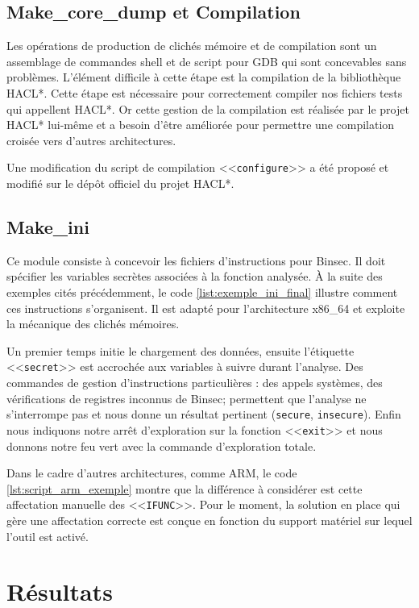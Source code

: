 \subsection*{Make\_core\_dump et Compilation}

Les opérations de production de clichés mémoire et de compilation sont un assemblage de commandes shell et de script pour GDB qui sont concevables sans problèmes. L'élément difficile à cette étape est la compilation de la bibliothèque HACL*. Cette étape est nécessaire pour correctement compiler nos fichiers tests qui appellent HACL*. Or cette gestion de la compilation est réalisée par le projet HACL* lui-même et a besoin d'être améliorée pour permettre une compilation croisée vers d'autres architectures.\smallbreak

Une modification du script de compilation <<\texttt{configure}>> a été proposé et modifié sur le dépôt officiel du projet HACL*.

\subsection*{Make\_ini}

Ce module consiste à concevoir les fichiers d'instructions pour Binsec. Il doit spécifier les variables secrètes associées à la fonction analysée. À la suite des exemples cités précédemment, le code \ref{list:exemple_ini_final} illustre comment ces instructions s'organisent. Il est adapté pour l'architecture x86\_64 et exploite la mécanique des clichés mémoires.\smallbreak

Un premier temps initie le chargement des données, ensuite l'étiquette <<\texttt{secret}>> est accrochée aux variables à suivre durant l'analyse. Des commandes de gestion d'instructions particulières : des appels systèmes, des vérifications de registres inconnus de Binsec; permettent que l'analyse ne s'interrompe pas et nous donne un résultat pertinent (\texttt{secure}, \texttt{insecure}). Enfin nous indiquons notre arrêt d'exploration sur la fonction <<\texttt{exit}>> et nous donnons notre feu vert avec la commande d'exploration totale.\medbreak

Dans le cadre d'autres architectures, comme ARM, le code \ref{lst:script_arm_exemple} montre que la différence à considérer est cette affectation manuelle des <<\texttt{IFUNC}>>. Pour le moment, la solution en place qui gère une affectation correcte est conçue en fonction du support matériel sur lequel l'outil est activé.

\section{Résultats}

